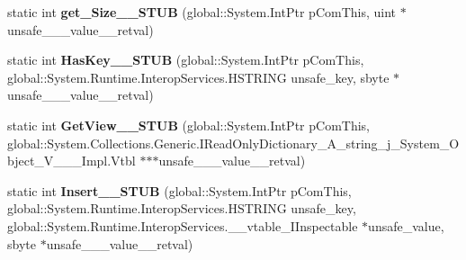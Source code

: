 \begin{DoxyCompactItemize}
\item 
\mbox{\label{struct_system_1_1_collections_1_1_generic_1_1_i_dictionary___a__string__j___system___object___v_______impl_1_1_vtbl_af4a5a903b46cb9fecb131bac2ccdf8d4}} 
static int {\bfseries get\+\_\+\+Size\+\_\+\+\_\+\+S\+T\+UB} (global\+::\+System.\+Int\+Ptr p\+Com\+This, uint $\ast$unsafe\+\_\+\+\_\+\+\_\+value\+\_\+\+\_\+retval)
\item 
\mbox{\label{struct_system_1_1_collections_1_1_generic_1_1_i_dictionary___a__string__j___system___object___v_______impl_1_1_vtbl_a972ac0c13db7e6d564603288e0e2433d}} 
static int {\bfseries Has\+Key\+\_\+\+\_\+\+S\+T\+UB} (global\+::\+System.\+Int\+Ptr p\+Com\+This, global\+::\+System.\+Runtime.\+Interop\+Services.\+H\+S\+T\+R\+I\+NG unsafe\+\_\+key, sbyte $\ast$unsafe\+\_\+\+\_\+\+\_\+value\+\_\+\+\_\+retval)
\item 
\mbox{\label{struct_system_1_1_collections_1_1_generic_1_1_i_dictionary___a__string__j___system___object___v_______impl_1_1_vtbl_a9882de5701b0ac3eaecba10f136a31ef}} 
static int {\bfseries Get\+View\+\_\+\+\_\+\+S\+T\+UB} (global\+::\+System.\+Int\+Ptr p\+Com\+This, global\+::\+System.\+Collections.\+Generic.\+I\+Read\+Only\+Dictionary\+\_\+\+A\+\_\+string\+\_\+j\+\_\+\+System\+\_\+\+Object\+\_\+\+V\+\_\+\+\_\+\+\_\+\+Impl.\+Vtbl $\ast$$\ast$$\ast$unsafe\+\_\+\+\_\+\+\_\+value\+\_\+\+\_\+retval)
\item 
\mbox{\label{struct_system_1_1_collections_1_1_generic_1_1_i_dictionary___a__string__j___system___object___v_______impl_1_1_vtbl_a8281771d0d8c28e4e4779badba319d69}} 
static int {\bfseries Insert\+\_\+\+\_\+\+S\+T\+UB} (global\+::\+System.\+Int\+Ptr p\+Com\+This, global\+::\+System.\+Runtime.\+Interop\+Services.\+H\+S\+T\+R\+I\+NG unsafe\+\_\+key, global\+::\+System.\+Runtime.\+Interop\+Services.\+\_\+\+\_\+vtable\+\_\+\+I\+Inspectable $\ast$unsafe\+\_\+value, sbyte $\ast$unsafe\+\_\+\+\_\+\+\_\+value\+\_\+\+\_\+retval)

\end{DoxyCompactItemize}
